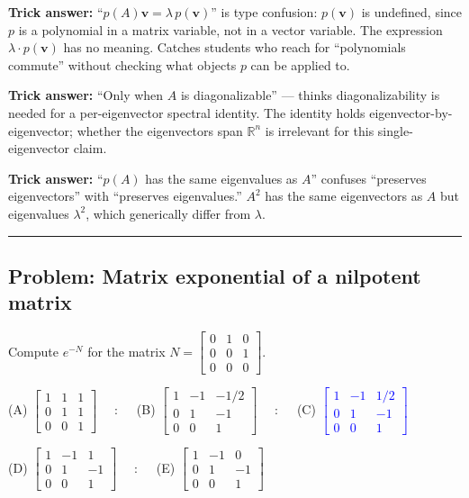 \documentclass[12pt]{amsart}
\newcommand{\divider}{
  \vspace{-1em}
  \noindent
  \raisebox{-0.15ex}{\textbullet}%
  \hspace{0.5em}%
  \rule[0.5ex]{0.95\textwidth}{1.0pt}%
  \hspace{0.5em}%
  \raisebox{-0.15ex}{\textbullet}%
  \vspace{0em}
}
\begin{document}
\textbf{Trick answer:}
``$p(A)\mathbf{v} = \lambda\, p(\mathbf{v})$'' is type confusion: $p(\mathbf{v})$
is undefined, since $p$ is a polynomial in a matrix variable, not in a
vector variable. The expression $\lambda \cdot p(\mathbf{v})$ has no
meaning. Catches students who reach for ``polynomials commute'' without
checking what objects $p$ can be applied to.

\textbf{Trick answer:}
``Only when $A$ is diagonalizable'' --- thinks diagonalizability is needed
for a per-eigenvector spectral identity. The identity holds
eigenvector-by-eigenvector; whether the eigenvectors span $\mathbb{R}^n$
is irrelevant for this single-eigenvector claim.

\textbf{Trick answer:}
``$p(A)$ has the same eigenvalues as $A$'' confuses ``preserves eigenvectors''
with ``preserves eigenvalues.'' $A^2$ has the same eigenvectors as $A$ but
eigenvalues $\lambda^2$, which generically differ from $\lambda$.

\divider

\subsection*{Problem: Matrix exponential of a nilpotent matrix}

Compute $e^{-N}$ for the matrix
$N = \begin{bmatrix} 0 & 1 & 0 \\ 0 & 0 & 1 \\ 0 & 0 & 0 \end{bmatrix}.$

\bigskip
(A) $\begin{bmatrix} 1 & 1 & 1 \\ 0 & 1 & 1 \\ 0 & 0 & 1 \end{bmatrix}$
$\quad : \quad$
(B) $\begin{bmatrix} 1 & -1 & -1/2 \\ 0 & 1 & -1 \\ 0 & 0 & 1 \end{bmatrix}$
$\quad : \quad$
(C) \textcolor{blue}{\textbf{$\begin{bmatrix} 1 & -1 & 1/2 \\ 0 & 1 & -1 \\ 0 & 0 & 1 \end{bmatrix}$}}

(D) $\begin{bmatrix} 1 & -1 & 1 \\ 0 & 1 & -1 \\ 0 & 0 & 1 \end{bmatrix}$
$\quad : \quad$
(E) $\begin{bmatrix} 1 & -1 & 0 \\ 0 & 1 & -1 \\ 0 & 0 & 1 \end{bmatrix}$
\bigskip
\end{document}
